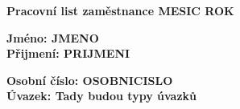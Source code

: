 \documentclass[10pt, a4paper]{article}%
\begin{document}
\clearpage
\begin{flushleft}%
	\Large\textbf{Pracovní list zaměstnance \hspace{2.85cm} MESIC ROK\\}
    \vspace*{0.5cm}
    \begin{minipage}{0.45\textwidth}
        \large\textbf{Jméno: JMENO}\\
        \large\textbf{Přijmení: PRIJMENI}
    \end{minipage}
    \hfill
    \begin{minipage}{0.45\textwidth}
        \large\textbf{Osobní číslo: OSOBNICISLO}\\
        \large\textbf{Úvazek: Tady budou typy úvazků}
    \end{minipage}

\end{flushleft}
\end{document}
